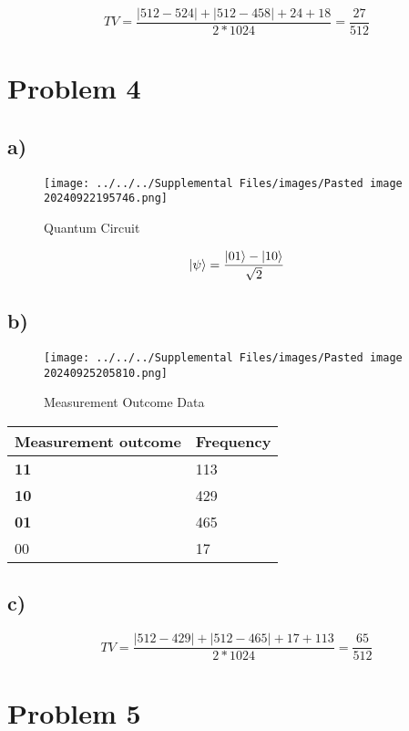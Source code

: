 \documentclass[]{article}
\begin{document}
\[
TV = \frac{\left| 512-524 \right| +\left| 512-458 \right| +24+18}{2*1024}  = \frac{27}{512}
\]

\hypertarget{problem-4}{%
\section{Problem 4}\label{problem-4}}

\hypertarget{a-2}{%
\subsection{a)}\label{a-2}}

\begin{figure}
\centering
\texttt{[image: ../../../Supplemental Files/images/Pasted image 20240922195746.png]}
\caption{Quantum Circuit}
\end{figure}

\[
\ket{\psi}  = \frac{{\ket{01} -\ket{10} }}{\sqrt{ 2 }}
\]

\hypertarget{b-2}{%
\subsection{b)}\label{b-2}}

\begin{figure}
\centering
\texttt{[image: ../../../Supplemental Files/images/Pasted image 20240925205810.png]}
\caption{Measurement Outcome Data}
\end{figure}

\begin{longtable}[]{@{}ll@{}}
\toprule\noalign{}
\textbf{Measurement outcome} & \textbf{Frequency} \\
\midrule\noalign{}
\endhead
\bottomrule\noalign{}
\endlastfoot
\textbf{11} & 113 \\
\textbf{10} & 429 \\
\textbf{01} & 465 \\
00 & 17 \\
\end{longtable}

\hypertarget{c-2}{%
\subsection{c)}\label{c-2}}

\[
TV = \frac{\left| 512-429 \right| +\left| 512-465 \right| +17+113}{2*1024}  =\frac{65}{512}
\]

\newpage
\hypertarget{problem-5}{%
\section{Problem 5}\label{problem-5}}
\end{document}

